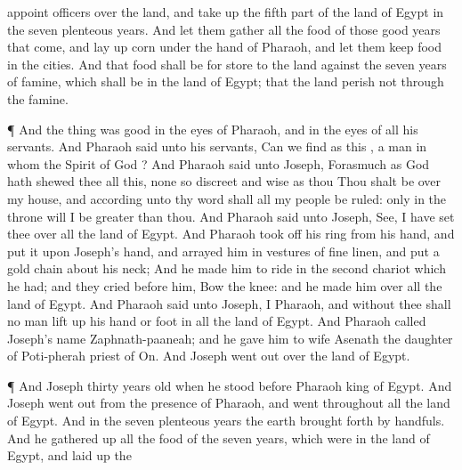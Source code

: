 {appoint
officers over the
land, and take up the fifth
part of the
land of
Egypt in the
seven
plenteous
years.
And let them
gather all the
food of those
good
years that
come, and lay
up
corn under the
hand of
Pharaoh, and let them
keep
food in the
cities.
And that
food shall be for
store to the
land against the
seven
years of
famine, which shall be in the
land of
Egypt; that the
land
perish not through the
famine.
\par }{\PP {}¶ And the
thing was
good in the
eyes of
Pharaoh, and in the
eyes of all his
servants.
And
Pharaoh
said unto his
servants, Can we
find
{} as
this
{}, a
man in
whom the
Spirit of
God
{}?
And
Pharaoh
said unto
Joseph,
Forasmuch as
God hath
shewed thee all this,
{} none so
discreet and
wise as thou
{}
Thou shalt
be over my
house, and according unto thy
word shall all my
people be
ruled: only in the
throne will I be
greater than thou.
And
Pharaoh
said unto
Joseph,
See, I have
set thee over all the
land of
Egypt.
And
Pharaoh took
off his
ring from his
hand, and
put it upon
Joseph’s
hand, and
arrayed him in
vestures of fine
linen, and
put a
gold
chain about his
neck;
And he made him to
ride in the
second
chariot which he had; and they
cried before
him, Bow the
knee: and he
made him
{} over all the
land of
Egypt.
And
Pharaoh
said unto
Joseph, I
{}
Pharaoh, and
without thee shall no
man lift
up his
hand or
foot in all the
land of
Egypt.
And
Pharaoh
called
Joseph’s
name
Zaphnath-paaneah; and he
gave him to
wife
Asenath the
daughter of
Poti-pherah
priest of
On. And
Joseph went
out over
{} the
land of
Egypt.
\par }{\PP {}¶ And
Joseph
{}
thirty
years
old when he
stood
before
Pharaoh
king of
Egypt. And
Joseph went
out from the
presence of
Pharaoh, and went
throughout all the
land of
Egypt.
And in the
seven
plenteous
years the
earth brought
forth by
handfuls.
And he gathered
up all the
food of the
seven
years, which were in the
land of
Egypt, and laid
up the
}
